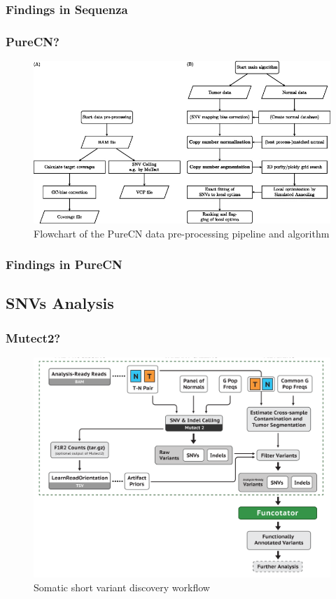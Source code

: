 \documentclass{beamer}
\begin{document}
    \begin{frame}
        \frametitle{Findings in Sequenza}
    \end{frame}

     \begin{frame}
        \frametitle{PureCN?}

        \begin{figure}
            \includegraphics[width=0.6 \linewidth]{figures/Workflow/pureCN.jpg}
            \caption{Flowchart of the PureCN data pre-processing pipeline and algorithm \protect\cite{pureCN1}}
        \end{figure}
    \end{frame}

    \begin{frame}
        \frametitle{Findings in PureCN}
    \end{frame}

    \subsection{SNVs Analysis}
    \begin{frame}
        \frametitle{Mutect2?}

        \begin{figure}
            \includegraphics[width=0.6 \linewidth]{figures/Workflow/somatic_short_variants.png}
            \caption{Somatic short variant discovery workflow \protect\cite{gatk1, gatk2}}
        \end{figure}
    \end{frame}
\end{document}
